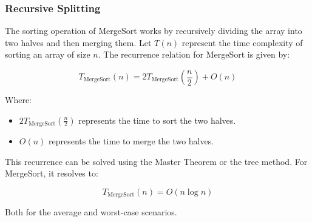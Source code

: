 \subsubsection{Recursive Splitting}
The sorting operation of MergeSort works by recursively dividing the array into two halves and then merging them. Let \(T(n)\) represent the time complexity of sorting an array of size \(n\). The recurrence relation for MergeSort is given by:

\[
T_{\text{MergeSort}}(n) = 2T_{\text{MergeSort}}\left(\frac{n}{2}\right) + O(n)
\]

Where:
\begin{itemize}
    \item \(2T_{\text{MergeSort}}\left(\frac{n}{2}\right)\) represents the time to sort the two halves.
    \item \(O(n)\) represents the time to merge the two halves.
\end{itemize}

This recurrence can be solved using the Master Theorem or the tree method. For MergeSort, it resolves to:

\[
T_{\text{MergeSort}}(n) = O(n \log n)
\]

Both for the average and worst-case scenarios.




